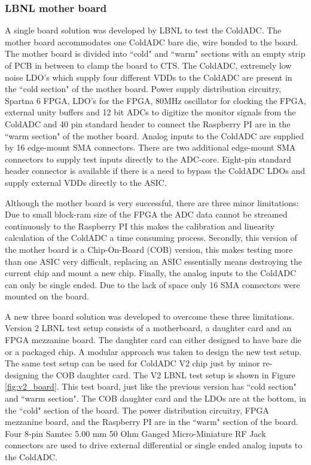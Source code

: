 \label{sec:2.4}


\subsubsection {LBNL mother board}

A single board solution was developed by LBNL to test the ColdADC. The mother board accommodates one ColdADC bare die, wire bonded to the board. The mother board is divided into ``cold" and ``warm" sections with an empty strip of PCB in between to clamp the board to CTS. The ColdADC, extremely low noise LDO's which supply four different VDDs to the ColdADC are present in the ``cold section" of the mother board. Power supply distribution circuitry, Spartna 6 FPGA, LDO's for the FPGA, 80MHz oscillator for clocking the FPGA, external unity buffers and 12 bit ADCs to digitize the monitor signals from the ColdADC and 40 pin standard header to connect the Raspberry PI are in the ``warm section" of the mother board. Analog inputs to the ColdADC are supplied by 16 edge-mount SMA connectors. There are two additional edge-mount SMA connectors to supply test inputs directly to the ADC-core. Eight-pin standard header connector is available if there is a need to bypass the ColdADC LDOs and supply external VDDs directly to the ASIC.

Although the mother board is very successful, there are three minor limitations: Due to small block-ram size of the FPGA the ADC data cannot be streamed continuously to the Raspberry PI this makes the calibration and linearity calculation of the ColdADC a time consuming process. Secondly, this version of the mother board is a Chip-On-Board (COB) version, this makes testing more than one ASIC very difficult, replacing an ASIC essentially means destroying the current chip and mount a new chip. Finally, the analog inputs to the ColdADC can only be single ended. Due to the lack of space only 16 SMA connectors were mounted on the board.  

A new three board solution was developed to overcome these three limitations. Version 2 LBNL test setup consists of a motherboard, a daughter card and an FPGA mezzanine board. The daughter card can either designed to have bare die or a packaged chip. A modular approach was taken to design the new test setup. The same test setup can be used for ColdADC V2 chip just by minor re-designing the COB daughter card. The V2 LBNL test setup is shown in Figure \ref{fig:v2_board}. This test board, just like the previous version has ``cold section" and ``warm section". The COB daughter card and the LDOs are at the bottom, in the ``cold" section of the board. The power distribution circuitry, FPGA mezzanine board, and the Raspberry PI are in the ``warm" section of the board. Four 8-pin Samtec 5.00 mm 50 Ohm Ganged Micro-Miniature RF Jack connectors are used to drive external differential or single ended analog inputs to the ColdADC.  

